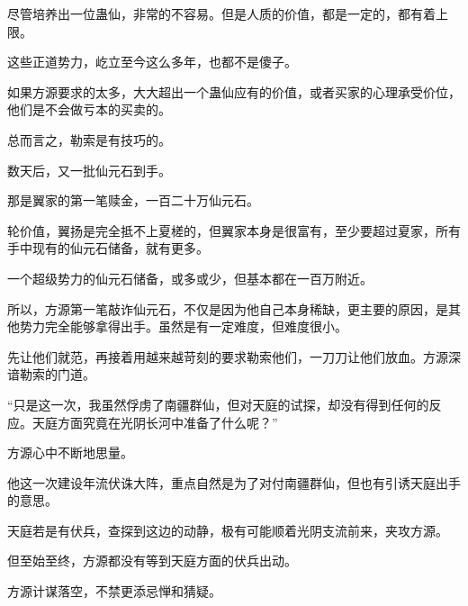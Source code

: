 \begin{this_body}
尽管培养出一位蛊仙，非常的不容易。但是人质的价值，都是一定的，都有着上限。

这些正道势力，屹立至今这么多年，也都不是傻子。

如果方源要求的太多，大大超出一个蛊仙应有的价值，或者买家的心理承受价位，他们是不会做亏本的买卖的。

总而言之，勒索是有技巧的。

数天后，又一批仙元石到手。

那是翼家的第一笔赎金，一百二十万仙元石。

轮价值，翼扬是完全抵不上夏槎的，但翼家本身是很富有，至少要超过夏家，所有手中现有的仙元石储备，就有更多。

一个超级势力的仙元石储备，或多或少，但基本都在一百万附近。

所以，方源第一笔敲诈仙元石，不仅是因为他自己本身稀缺，更主要的原因，是其他势力完全能够拿得出手。虽然是有一定难度，但难度很小。

先让他们就范，再接着用越来越苛刻的要求勒索他们，一刀刀让他们放血。方源深谙勒索的门道。

“只是这一次，我虽然俘虏了南疆群仙，但对天庭的试探，却没有得到任何的反应。天庭方面究竟在光阴长河中准备了什么呢？”

方源心中不断地思量。

他这一次建设年流伏诛大阵，重点自然是为了对付南疆群仙，但也有引诱天庭出手的意思。

天庭若是有伏兵，查探到这边的动静，极有可能顺着光阴支流前来，夹攻方源。

但至始至终，方源都没有等到天庭方面的伏兵出动。

方源计谋落空，不禁更添忌惮和猜疑。

\end{this_body}

